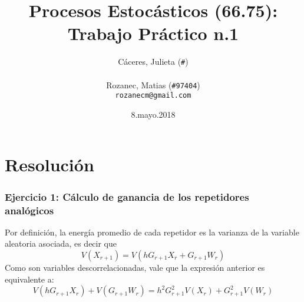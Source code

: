 \documentclass{article}
\title{Procesos Estocásticos (66.75): Trabajo Práctico n.1}
\author{
    Cáceres, Julieta (\texttt{\#})\\\texttt{}\\
    Rozanec, Matias (\texttt{\#97404})\\\texttt{rozanecm@gmail.com}}
\date{8.mayo.2018}
\begin{document}
\maketitle
\newpage

\tableofcontents
\newpage

% 

\part{Resolución}
\section{Ejercicio 1: Cálculo de ganancia de los repetidores analógicos}
\iffalse
Por definición, la energía promedio de cada repetidor es la varianza de la variable aleatoria asociada, es decir que
\begin{equation}
    V(X_{r+1})=V(h G_{r+1} X_r + G_{r+1} W_r)
\end{equation}
Como son variables descorrelacionadas, vale que la expresión anterior es equivalente a:
\begin{equation}\label{eq:2}
    V(h G_{r+1} X_r) + V(G_{r+1}W_r)=h^2 G_{r+1}^2 V(X_r) + G_{r+1}^2 V(W_r)
\end{equation}
\end{document}
